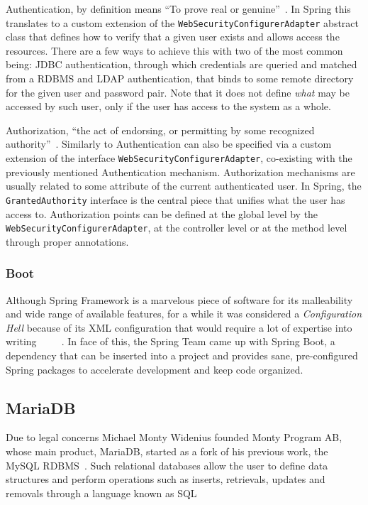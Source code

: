 Authentication, by definition means ``To prove real or genuine''~\cite{merriamwebster}. In Spring this translates to a custom extension of the \texttt{WebSecurityConfigurerAdapter} abstract class that defines how to verify that a given user exists and allows access the resources. There are a few ways to achieve this with two of the most common being: \gls{JDBC} authentication, through which credentials are queried and matched from a \gls{RDBMS} and \gls{LDAP} authentication, that binds to some remote directory for the given user and password pair. Note that it does not define \textit{what} may be accessed by such user, only if the user has access to the system as a whole.

Authorization, ``the act of endorsing, or permitting by some recognized authority''~\cite{merriamwebster}. Similarly to Authentication can also be specified via a custom extension of the interface \texttt{WebSecurityConfigurerAdapter}, co-existing with the previously mentioned Authentication mechanism. Authorization mechanisms are usually related to some attribute of the current authenticated user. In Spring, the \texttt{GrantedAuthority} interface is the central piece that unifies what the user has access to. Authorization points can be defined at the global level by the \texttt{WebSecurityConfigurerAdapter}, at the controller level or at the method level through proper annotations.

\subsubsection{Boot}
Although Spring Framework is a marvelous piece of software for its malleability and wide range of available features, for a while it was considered a \textit{Configuration Hell} because of its \gls{XML} configuration that would require a lot of expertise into writing~\cite{xmlhell1}~\cite{xmlhell2}~\cite{xmlhell3}~\cite{xmlhell4}~\cite{xmlhell5}. In face of this, the Spring Team came up with Spring Boot, a dependency that can be inserted into a project and provides sane, pre-configured Spring packages to accelerate development and keep code organized.

\subsection{MariaDB}
Due to legal concerns Michael Monty Widenius founded Monty Program AB, whose main product, MariaDB, started as a fork of his previous work, the MySQL \gls{RDBMS}~\cite{MAVRO:2014}. Such relational databases allow the user to define data structures and perform operations such as inserts, retrievals, updates and removals through a language known as \gls{SQL}

